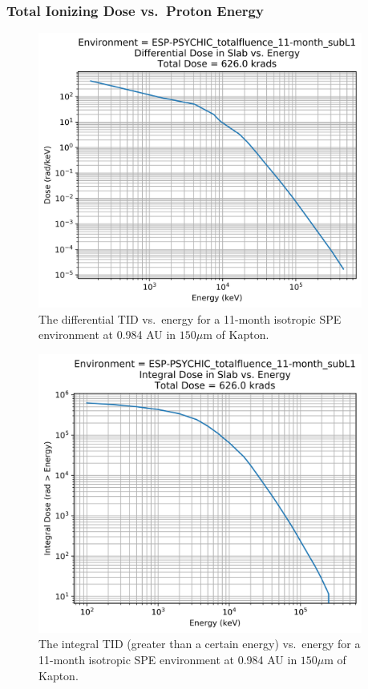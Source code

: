\documentclass{hitec}
\begin{document}
\clearpage %

\subsubsection{Total Ionizing Dose vs.\ Proton Energy}
\label{sssec:TID-SPE-Dose vs Energy}

\begin{figure}[htbp!]
	\centering
	\includegraphics[width=0.95\textwidth]{../ESP-PSYCHIC_totalfluence_11-month_subL1_Differential_Dose_vs_Energy.png}
	\caption{The differential TID vs.\ energy for a 11-month isotropic SPE environment at 0.984 AU in $150 \mu$m of Kapton.}\label{fig:ESP-PSYCHIC_totalfluence_11-month_subL1_Differential_Dose_vs_Energy}
\end{figure}

\begin{figure}[htbp!]
	\centering
	\includegraphics[width=0.95\textwidth]{../ESP-PSYCHIC_totalfluence_11-month_subL1_Integral_Dose_vs_Energy.png}
	\caption{The integral TID (greater than a certain energy) vs.\ energy for a 11-month isotropic SPE environment at 0.984 AU in $150 \mu$m of Kapton.}\label{fig:ESP-PSYCHIC_totalfluence_11-month_subL1_Integral_Dose_vs_Energy}
\end{figure}
\end{document}
